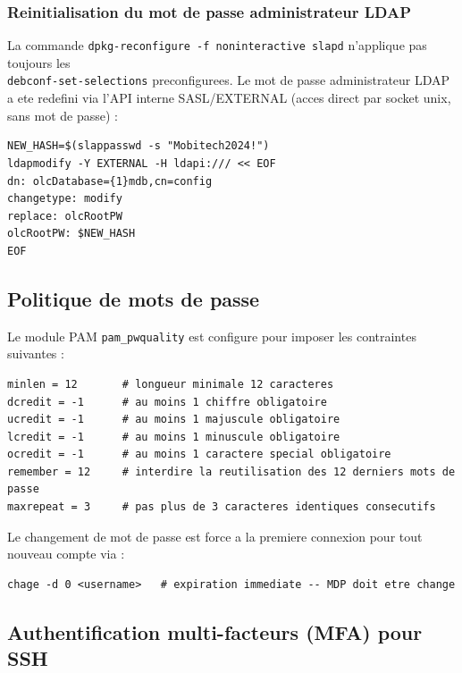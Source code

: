 \documentclass[11pt,a4paper]{article}
\begin{document}
\subsubsection{Reinitialisation du mot de passe administrateur LDAP}

La commande \texttt{dpkg-reconfigure -f noninteractive slapd} n'applique pas toujours les \\ \texttt{debconf-set-selections} preconfigurees. Le mot de passe administrateur LDAP a ete redefini via l'API interne SASL/EXTERNAL (acces direct par socket unix, sans mot de passe) :

\begin{lstlisting}[caption={Reset du mot de passe admin LDAP via SASL/EXTERNAL}]
NEW_HASH=$(slappasswd -s "Mobitech2024!")
ldapmodify -Y EXTERNAL -H ldapi:/// << EOF
dn: olcDatabase={1}mdb,cn=config
changetype: modify
replace: olcRootPW
olcRootPW: $NEW_HASH
EOF
\end{lstlisting}

\subsection{Politique de mots de passe}

Le module PAM \texttt{pam\_pwquality} est configure pour imposer les contraintes suivantes :

\begin{lstlisting}[caption={/etc/security/pwquality.conf}]
minlen = 12       # longueur minimale 12 caracteres
dcredit = -1      # au moins 1 chiffre obligatoire
ucredit = -1      # au moins 1 majuscule obligatoire
lcredit = -1      # au moins 1 minuscule obligatoire
ocredit = -1      # au moins 1 caractere special obligatoire
remember = 12     # interdire la reutilisation des 12 derniers mots de passe
maxrepeat = 3     # pas plus de 3 caracteres identiques consecutifs
\end{lstlisting}

Le changement de mot de passe est force a la premiere connexion pour tout nouveau compte via :

\begin{lstlisting}[caption={Forcer le changement de MDP a la premiere connexion}]
chage -d 0 <username>   # expiration immediate -- MDP doit etre change
\end{lstlisting}

\subsection{Authentification multi-facteurs (MFA) pour SSH}
\end{document}
